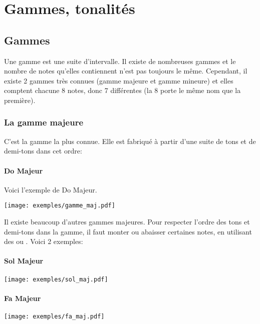\chapter{Gammes, tonalités}
\section{Gammes}
Une gamme est une suite d'intervalle. Il existe de nombreuses gammes et le nombre de notes qu'elles contiennent n'est pas toujours le même. Cependant, il existe 2 gammes très connues (gamme majeure et gamme mineure) et elles comptent chacune 8 notes, donc 7 différentes (la 8\ieme{} porte le même nom que la première).
\subsection{La gamme majeure}
C'est la gamme la plus connue. Elle est fabriqué à partir d'une suite de tons et de demi-tons dans cet ordre:
\begin{center}
\end{center}
\subsubsection{Do Majeur}

Voici l'exemple de Do Majeur.
\begin{center}
\texttt{[image: exemples/gamme\_maj.pdf]}
\end{center}

Il existe beaucoup d'autres gammes majeures. Pour respecter l'ordre des tons et demi-tons dans la gamme, il faut monter ou abaisser certaines notes, en utilisant des \sharp{} ou \flat. Voici 2 exemples:
\subsubsection{Sol Majeur}
\begin{center}
\texttt{[image: exemples/sol\_maj.pdf]}
\end{center}

\subsubsection{Fa Majeur}
\begin{center}
\texttt{[image: exemples/fa\_maj.pdf]}
\end{center}

